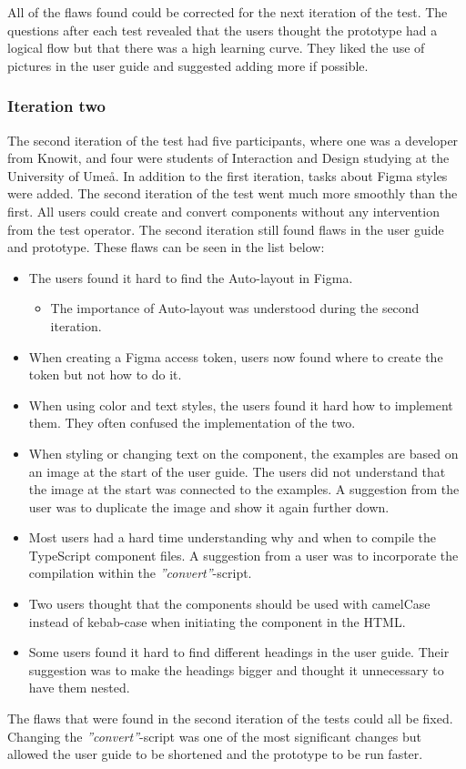 All of the flaws found could be corrected for the next iteration of the test. The questions after each test revealed that the users thought the prototype had a logical flow but that there was a high learning curve. They liked the use of pictures in the user guide and suggested adding more if possible.  

\subsubsection{Iteration two}%
\label{ssub:Iteration two}
The second iteration of the test had five participants, where one was a developer from Knowit, and four were students of Interaction and Design studying at the University of Umeå. In addition to the first iteration, tasks about Figma styles were added. The second iteration of the test went much more smoothly than the first. All users could create and convert components without any intervention from the test operator. The second iteration still found flaws in the user guide and prototype. These flaws can be seen in the list below:

\begin{itemize}
   \item The users found it hard to find the Auto-layout in Figma.
      \begin{itemize}
         \item The importance of Auto-layout was understood during the second iteration.
      \end{itemize}
   \item When creating a Figma access token, users now found where to create the token but not how to do it.
   \item When using color and text styles, the users found it hard how to implement them. They often confused the implementation of the two. 
   \item When styling or changing text on the component, the examples are based on an image at the start of the user guide. The users did not understand that the image at the start was connected to the examples. A suggestion from the user was to duplicate the image and show it again further down.
   \item Most users had a hard time understanding why and when to compile the TypeScript component files. A suggestion from a user was to incorporate the compilation within the \textit{''convert''}-script.
   \item Two users thought that the components should be used with camelCase instead of kebab-case when initiating the component in the HTML.
   \item Some users found it hard to find different headings in the user guide. Their suggestion was to make the headings bigger and thought it unnecessary to have them nested.
\end{itemize}

The flaws that were found in the second iteration of the tests could all be fixed. Changing the \textit{''convert''}-script was one of the most significant changes but allowed the user guide to be shortened and the prototype to be run faster.


